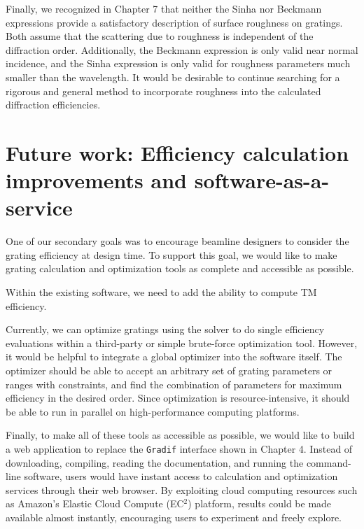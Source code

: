Finally, we recognized in Chapter 7 that neither the Sinha nor Beckmann expressions provide a satisfactory description of surface roughness on gratings.  Both assume that the scattering due to roughness is independent of the diffraction order.  Additionally, the Beckmann expression is only valid near normal incidence, and the Sinha expression is only valid for roughness parameters much smaller than the wavelength.  It would be desirable to continue searching for a rigorous and general method to incorporate roughness into the calculated diffraction efficiencies.

\clearpage
\section{Future work: Efficiency calculation improvements and software-as-a-service}
One of our secondary goals was to encourage beamline designers to consider the grating efficiency at design time.  To support this goal, we would like to make grating calculation and optimization tools as complete and accessible as possible.

Within the existing software, we need to add the ability to compute TM efficiency.

Currently, we can optimize gratings using the solver to do single efficiency evaluations within a third-party or simple brute-force optimization tool.  However, it would be helpful to integrate a global optimizer into the software itself.  The optimizer should be able to accept an arbitrary set of grating parameters or ranges with constraints, and find the combination of parameters for maximum efficiency in the desired order.  Since optimization is resource-intensive, it should be able to run in parallel on high-performance computing platforms.

Finally, to make all of these tools as accessible as possible, we would like to build a web application to replace the \texttt{Gradif} interface shown in Chapter 4.  Instead of downloading, compiling, reading the documentation, and running the command-line software, users would have instant access to calculation and optimization services through their web browser.  By exploiting cloud computing resources such as Amazon's Elastic Cloud Compute (EC$^2$) platform, results could be made available almost instantly, encouraging users to experiment and freely explore.